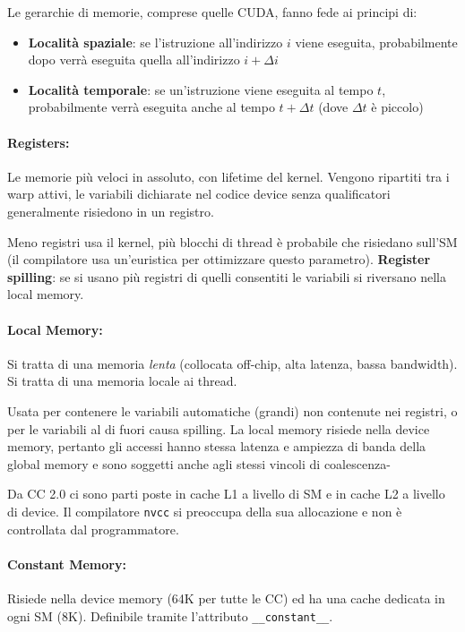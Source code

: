 Le gerarchie di memorie, comprese quelle CUDA, fanno fede ai principi di: 
\begin{itemize}
	\item \textbf{Località spaziale}: se l'istruzione all'indirizzo $i$ viene eseguita, probabilmente dopo verrà eseguita quella all'indirizzo $i + \Delta i$
	
	\item \textbf{Località temporale}: se un'istruzione viene eseguita al tempo $t$, probabilmente verrà eseguita anche al tempo $t + \Delta t$ (dove $\Delta t$ è piccolo)
\end{itemize}

\paragraph{Registers:} Le memorie più veloci in assoluto, con lifetime del kernel. Vengono ripartiti tra i warp attivi, le variabili dichiarate nel codice device senza qualificatori generalmente risiedono in un registro. 

Meno registri usa il kernel, più blocchi di thread è probabile che risiedano sull'SM (il compilatore usa un'euristica per ottimizzare questo parametro). \textbf{Register spilling}: se si usano più registri di quelli consentiti le variabili si riversano nella local memory.

\paragraph{Local Memory:} Si tratta di una memoria \textit{lenta} (collocata off-chip, alta latenza, bassa bandwidth). Si tratta di una memoria locale ai thread.

Usata per contenere le variabili automatiche (grandi) non contenute nei registri, o per le variabili al di fuori causa spilling. La local memory risiede nella device memory, pertanto gli accessi hanno stessa latenza e ampiezza di banda della global memory e sono soggetti anche agli stessi vincoli di coalescenza-

Da CC 2.0 ci sono parti poste in cache L1 a livello di SM e in cache L2 a livello di device. Il compilatore \texttt{nvcc} si preoccupa della sua allocazione e non è controllata dal programmatore.

\paragraph{Constant Memory:} Risiede nella device memory (64K per tutte le CC) ed ha una cache dedicata in ogni SM (8K). Definibile tramite l'attributo \texttt{\_\_constant\_\_}. 

